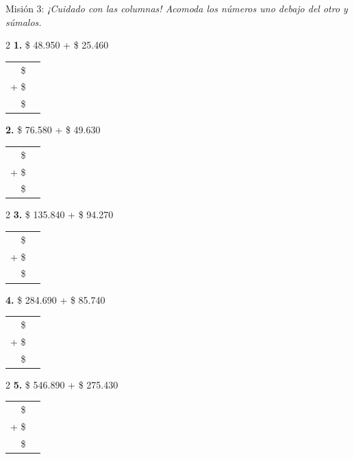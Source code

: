 \documentclass[12pt, letterpaper]{article}
\newcommand{\boxfill}[1][1.2cm]{\tcbox[on line, size=minimal, colframe=valdark!80, colback=white, boxrule=0.5pt, arc=1mm, boxsep=2pt, left=2pt, right=2pt, top=2pt, bottom=2pt]{\makebox[#1]{\vphantom{M}}}}
\begin{document}
\vspace{0.2cm}
\begin{practica}{Misión 3: }
\textit{¡Cuidado con las columnas! Acomoda los números uno debajo del otro y súmalos.}

\vspace{0.4cm}
\begin{multicols}{2}
    \textbf{1.} \$ 48.950 + \$ 25.460 \\[0.3cm]
    \begin{tabular}{rr}
      \$ & \boxfill[2cm] \\
    + \$ & \boxfill[2cm] \\
    \hline
      \$ & \boxfill[2cm]
    \end{tabular}

    \textbf{2.} \$ 76.580 + \$ 49.630 \\[0.3cm]
    \begin{tabular}{rr}
      \$ & \boxfill[2cm] \\
    + \$ & \boxfill[2cm] \\
    \hline
      \$ & \boxfill[2cm]
    \end{tabular}
\end{multicols}

\vspace{0.5cm}
\begin{multicols}{2}
    \textbf{3.} \$ 135.840 + \$ 94.270 \\[0.3cm]
    \begin{tabular}{rr}
      \$ & \boxfill[2cm] \\
    + \$ & \boxfill[2cm] \\
    \hline
      \$ & \boxfill[2cm]
    \end{tabular}

    \textbf{4.} \$ 284.690 + \$ 85.740 \\[0.3cm]
    \begin{tabular}{rr}
      \$ & \boxfill[2cm] \\
    + \$ & \boxfill[2cm] \\
    \hline
      \$ & \boxfill[2cm]
    \end{tabular}
\end{multicols}

\vspace{0.5cm}
\begin{multicols}{2}
    \textbf{5.} \$ 546.890 + \$ 275.430 \\[0.3cm]
    \begin{tabular}{rr}
      \$ & \boxfill[2cm] \\
    + \$ & \boxfill[2cm] \\
    \hline
      \$ & \boxfill[2cm]
    \end{tabular}


\end{multicols}
\end{practica}
\end{document}
